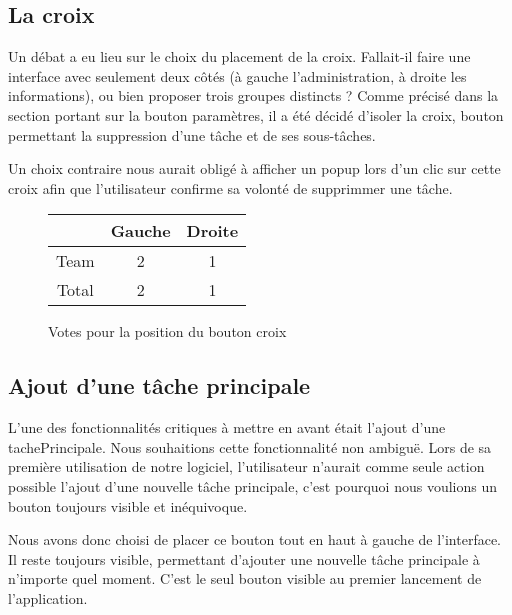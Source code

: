 \documentclass[11pt]{article}
\begin{document}
\subsection{La croix}
\label{subsec:croixPlacement}

Un débat a eu lieu sur le choix du placement de la croix. Fallait-il
faire une interface avec seulement deux côtés (à gauche
l'administration, à droite les informations), ou bien proposer trois
groupes distincts ? Comme précisé dans la section portant sur la
bouton paramètres, il a été décidé d'isoler la croix, bouton
permettant la suppression d'une tâche et de ses sous-tâches.

Un choix contraire nous aurait obligé à afficher un popup lors d'un
clic sur cette croix afin que l'utilisateur confirme sa volonté de
supprimmer une tâche.

\begin{figure}[!h]
  \centering
  \begin{tabular}[!h]{cc|c}
    & Gauche & Droite\\
    \hline
    Team & 2 & 1\\
    \hline
    Total & 2 & 1\\
  \end{tabular}
  \caption{Votes pour la position du bouton croix}
  \label{fig:votecroix}
\end{figure}



\subsection{Ajout d'une tâche principale}

L'une des fonctionnalités critiques à mettre en avant était l'ajout
d'une \gls{tachePrincipale}. Nous souhaitions cette fonctionnalité non
ambiguë. Lors de sa première utilisation de notre logiciel,
l'utilisateur n'aurait comme seule action possible l'ajout d'une
nouvelle tâche principale, c'est pourquoi nous voulions un bouton
toujours visible et inéquivoque.

Nous avons donc choisi de placer ce bouton tout en haut à gauche de
l'interface. Il reste toujours visible, permettant d'ajouter une
nouvelle tâche principale à n'importe quel moment. C'est le seul
bouton visible au premier lancement de l'application.
\end{document}
